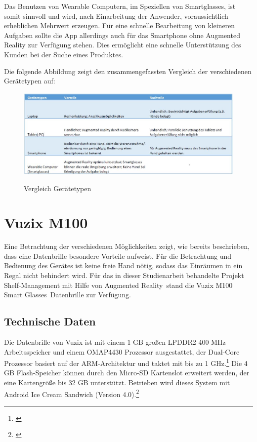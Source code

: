 Das Benutzen von Wearable Computern, im Speziellen von Smartglasses, ist somit sinnvoll und wird, nach Einarbeitung der Anwender, voraussichtlich erheblichen Mehrwert erzeugen. Für eine schnelle Bearbeitung von kleineren Aufgaben sollte die App allerdings auch für das Smartphone ohne Augmented Reality zur Verfügung stehen. Dies ermöglicht \zB eine schnelle Unterstützung des Kunden bei der Suche eines Produktes.

Die folgende Abbildung zeigt den zusammengefassten Vergleich der verschiedenen Gerätetypen auf:
\begin{figure}[H]
	\centering
	{\includegraphics[width=\textwidth]{Bilder/device_comparison.jpg}}
	\caption{Vergleich Gerätetypen}
	\label{fig:role_web}
\end{figure}

\section{Vuzix M100}
\label{sec:vuzix}
Eine Betrachtung der verschiedenen Möglichkeiten zeigt, wie bereits beschrieben, dass eine Datenbrille besondere Vorteile aufweist. Für die Betrachtung und Bedienung des Gerätes ist keine freie Hand nötig, sodass das Einräumen in ein Regal nicht behindert wird. Für das in dieser Studienarbeit behandelte Projekt \glqq Shelf-Management mit Hilfe von Augmented Reality\grqq\ stand die \glqq Vuzix M100 Smart Glasses\grqq\ Datenbrille zur Verfügung.

\subsection{Technische Daten}
Die Datenbrille von Vuzix ist mit einem 1 \ac{GB} großen LPDDR2 400 \ac{MHz} Arbeitsspeicher und einem OMAP4430 Prozessor ausgestattet, der Dual-Core Prozessor basiert auf der \acs{ARM}-Architektur und taktet mit bis zu 1 \ac{GHz}.\footnote{\citep{omap4430}} Die 4 \ac{GB} Flash-Speicher können durch den Micro-\acs{SD} Kartenslot erweitert werden, der eine Kartengröße bis 32 \ac{GB} unterstützt. Betrieben wird dieses System mit Android Ice Cream Sandwich (Version 4.0).\footnote{\citep{vuzixm100}}\\

